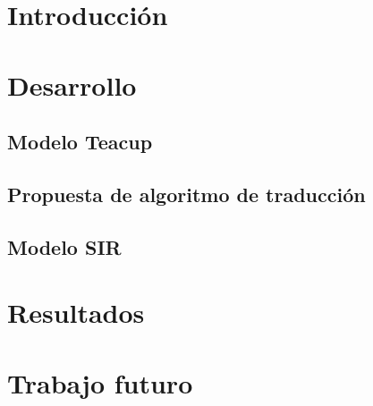 \documentclass[11pt, a4paper]{article}
\begin{document}

\maketitle
\newpage

\tableofcontents
\newpage

%
\section{Introducción}


\section{Desarrollo}

\subsection{Modelo Teacup}

\subsection{Propuesta de algoritmo de traducción}


\subsection{Modelo SIR}


\section{Resultados}


\section{Trabajo futuro}


%
% 
%
\end{document}
